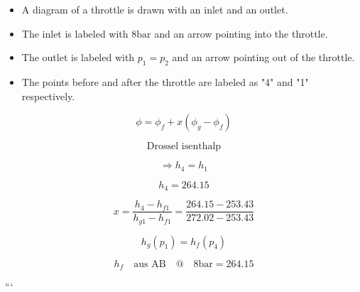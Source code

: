 \begin{itemize}
    \item A diagram of a throttle is drawn with an inlet and an outlet.
    \item The inlet is labeled with $8 \text{bar}$ and an arrow pointing into the throttle.
    \item The outlet is labeled with $p_1 = p_2$ and an arrow pointing out of the throttle.
    \item The points before and after the throttle are labeled as "4" and "1" respectively.
\end{itemize}

\[
\phi = \phi_f + x (\phi_g - \phi_f)
\]

\[
\text{Drossel isenthalp}
\]

\[
\Rightarrow h_4 = h_1
\]

\[
h_4 = 264.15
\]

\[
x = \frac{h_4 - h_{f1}}{h_{g1} - h_{f1}} = \frac{264.15 - 253.43}{272.02 - 253.43}
\]

\[
h_g(p_1) = h_f(p_4)
\]

\[
h_f \quad \text{aus AB} \quad @ \quad 8 \text{bar} = 264.15
\]

```